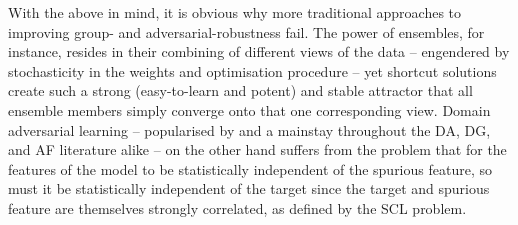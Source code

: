 With the above in mind, it is obvious why more traditional approaches to improving group- and
adversarial-robustness fail. 
%
The power of ensembles, for instance, resides in their combining of different views of the data --
engendered by stochasticity in the weights and optimisation procedure -- yet shortcut solutions
create such a strong (easy-to-learn and potent) and stable attractor that all ensemble
members simply converge onto that one corresponding view.
%
Domain adversarial learning -- popularised by \cite{ganin2016domain} and a mainstay throughout the
\ac{DA}, \ac{DG}, and \ac{AF} literature alike -- on the other hand suffers from the problem that for the
features of the model to be statistically independent of the spurious feature, so must it be
statistically independent of the target since the target and spurious feature are themselves
strongly correlated, as defined by the \ac{SCL} problem.


